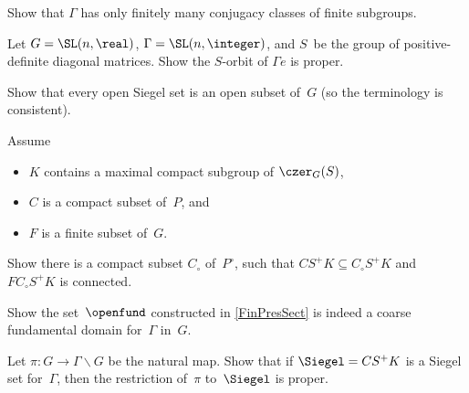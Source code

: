 \begin{exercises}

\item  \label{FinManyFinSubgrps}
Show that
$\Gamma$ has only finitely many conjugacy classes of finite subgroups.

\item \label{SplitDiv}
Let $G = \SL(n,\real)$, $\Gamma = \SL(n,\integer)$, and $S$~be the group of positive-definite diagonal matrices. Show the $S$-orbit of $\Gamma e$ is proper.


\item Show that every open Siegel set is an open subset of~$G$ (so the terminology is consistent).

\item \label{CanHaveCinP}
Assume 
	\begin{itemize}
	\item $K$ contains a maximal compact subgroup of $\czer_G(S)$,
	\item $C$ is a compact subset of~$P$, 
	and 
	\item $F$ is a finite subset of~$G$.
	\end{itemize}
Show there is a compact subset $C_\circ$ of~$P^\circ$, such that $C S^+ K \subseteq C_\circ S^+ K$ and $F C_\circ S^+ K$ is connected.

\item \label{openfundIsFund}
Show the set~$\openfund$ constructed in \cref{FinPresSect} is indeed a coarse fundamental domain for~$\Gamma$ in~$G$.

\item \label{ProperOnSiegel}
Let $\pi \colon G \to \Gamma \backslash G$ be the natural map.
Show that if $\Siegel = C S^+ K$ is a Siegel set for~$\Gamma$, then the restriction of~$\pi$ to~$\Siegel$ is proper.


\end{exercises}
